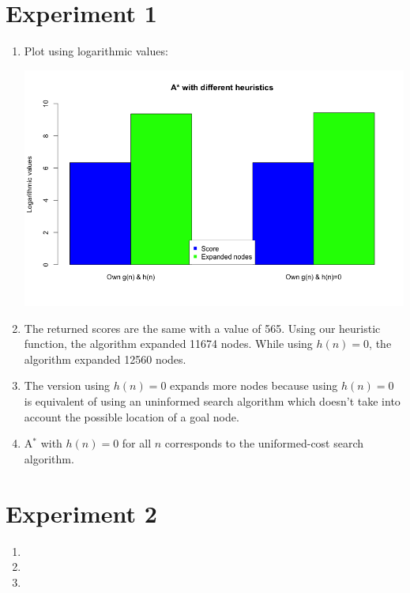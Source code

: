 \documentclass{article}
\begin{document}
\section{Experiment 1}

\begin{enumerate}[label=\alph*.,leftmargin=1.35em]
    \item Plot using logarithmic values:\\
    \begin{center}\includegraphics[scale=0.4]{q3_plot.png}\end{center}
    \item The returned scores are the same with a value of 565. Using our heuristic function, the algorithm expanded 11674 nodes. While using $h(n)=0$, the algorithm expanded 12560 nodes.
    \item The version using $h(n) = 0$ expands more nodes because using $h(n) = 0$ is equivalent of using an uninformed search algorithm which doesn't take into account the possible location of a goal node.
    \item A$^*$ with $h(n) = 0$ for all $n$ corresponds to the uniformed-cost search algorithm.
\end{enumerate}

\section{Experiment 2}

\begin{enumerate}[label=\alph*.,leftmargin=1.35em]
    \item
    \item
    \item
\end{enumerate}


\end{document}
